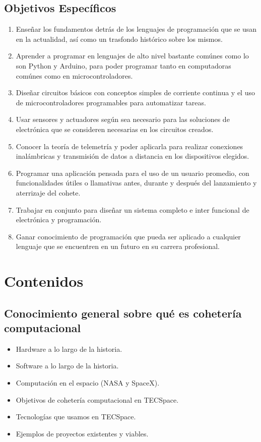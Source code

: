 ﻿\documentclass[letterpaper]{article}
\begin{document}
\subsection{Objetivos Específicos}
\begin{enumerate}
    \item Enseñar los fundamentos detrás de los lenguajes de programación que se usan en la
        actualidad, así como un trasfondo histórico sobre los mismos.
    \item Aprender a programar en lenguajes de alto nivel bastante comúnes como lo son Python y
        Arduino, para poder programar tanto en computadoras comúnes como en microcontroladores.
    \item Diseñar circuitos básicos con conceptos simples de corriente continua y el uso de
        microcontroladores programables para automatizar tareas.
    \item Usar sensores y actuadores según sea necesario para las soluciones de electrónica que se
        consideren necesarias en los circuitos creados.
    \item Conocer la teoría de telemetría y poder aplicarla para realizar conexiones inalámbricas y
        transmisión de datos a distancia en los dispositivos elegidos.
    \item Programar una aplicación pensada para el uso de un usuario promedio, con funcionalidades
        útiles o llamativas antes, durante y después del lanzamiento y aterrizaje del cohete.
    \item Trabajar en conjunto para diseñar un sistema completo e inter funcional de electrónica
        y programación.
    \item Ganar conocimiento de programación que pueda ser aplicado a cualquier lenguaje que se
        encuentren en un futuro en su carrera profesional.
\end{enumerate}

\clearpage
\section{Contenidos}
\subsection{Conocimiento general sobre qué es cohetería computacional}
\begin{itemize}
    \item Hardware a lo largo de la historia.
    \item Software a lo largo de la historia.
    \item Computación en el espacio (NASA y SpaceX).
    \item Objetivos de cohetería computacional en TECSpace.
    \item Tecnologías que usamos en TECSpace.
    \item Ejemplos de proyectos existentes y viables.
\end{itemize}
\end{document}
